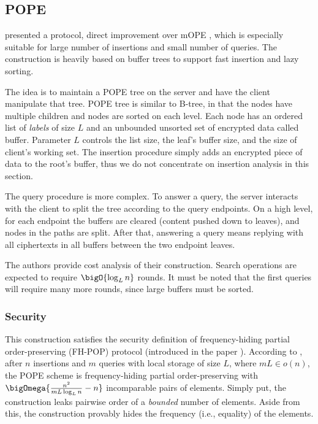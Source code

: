 \subsection{POPE \texorpdfstring{\cite{pope}}{}}

	\textcite{pope} presented a protocol, direct improvement over mOPE \cite{ope-ideal-security-protocol}, which is especially suitable for large number of insertions and small number of queries.
	The construction is heavily based on buffer trees \cite{buffer-tree} to support fast insertion and lazy sorting.

	The idea is to maintain a POPE tree on the server and have the client manipulate that tree.
	POPE tree is similar to B-tree, in that the nodes have multiple children and nodes are sorted on each level.
	Each node has an ordered list of \emph{labels} of size $L$ and an unbounded unsorted set of encrypted data called buffer.
	Parameter $L$ controls the list size, the leaf's buffer size, and the size of client's working set.
	The insertion procedure simply adds an encrypted piece of data to the root's buffer, thus we do not concentrate on insertion analysis in this section.

	The query procedure is more complex.
	To answer a query, the server interacts with the client to split the tree according to the query endpoints.
	On a high level, for each endpoint the buffers are cleared (content pushed down to leaves), and nodes in the paths are split.
	After that, answering a query means replying with all ciphertexts in all buffers between the two endpoint leaves.

	The authors provide cost analysis of their construction.
	Search operations are expected to require $\bigO{\log_L n}$ rounds.
	It must be noted that the first queries will require many more rounds, since large buffers must be sorted.

	\subsubsection{Security}

		This construction satisfies the security definition of frequency\hyp{}hiding partial order-preserving (FH-POP) protocol (introduced in the paper \cite{pope}).
		According to \cite[Theorem~3]{pope}, after $n$ insertions and $m$ queries with local storage of size $L$, where $m L \in o(n)$, the POPE scheme is frequency-hiding partial order-preserving with $\bigOmega{ \frac{n^2}{mL \log_L n} - n }$ incomparable pairs of elements. %
		Simply put, the construction leaks pairwise order of a \emph{bounded} number of elements.
		Aside from this, the construction provably hides the frequency (i.e., equality) of the elements.

